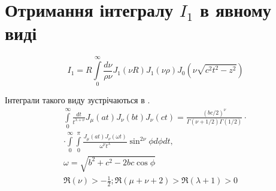 \section{Отримання інтегралу $ I_1 $ в явному виді} \label{sec:i1anal}
%
\begin{equation} \label{eq:int1start}
I_1 = R \int\limits_{0}^{\infty} \frac{d\nu}{\rho \nu} 
J_1 \left( \nu R \right) J_1 \left( \nu \rho \right) 
J_0 \left( \nu \sqrt{c^2 t^2 - z^2} \right)
\end{equation}

Інтеграли такого виду зустрічаються в \cite[ст. 398]{imp:Watson1922}.
\begin{equation} \begin{aligned} \label{eq:intJJJtable}
\int\limits_{0}^{\infty} \frac{d t}{t^{\lambda + \nu}} 
J_\mu \left( at \right) J_\nu \left( bt \right) J_\nu \left( ct \right) =
\frac{ \left( bc/2 \right) ^\nu }
{ \Gamma \left( \nu + 1/2 \right) \Gamma \left( 1/2 \right) } \cdot \\
\cdot \int\limits_{0}^{\infty} \int\limits_{0}^{\pi}
\frac{J_\mu \left( at \right) J_\nu \left( \omega t \right)}
{\omega^\nu t^\lambda} \sin^{2\nu}{\phi} d\phi dt, \\
\omega = \sqrt{b^2 + c^2 - 2bc \cos \phi} \\
\Re \left( \nu \right) > - \frac{1}{2};
\Re \left( \mu + \nu + 2 \right) > \Re \left( \lambda + 1 \right) > 0
\end{aligned} \end{equation}
%
%
